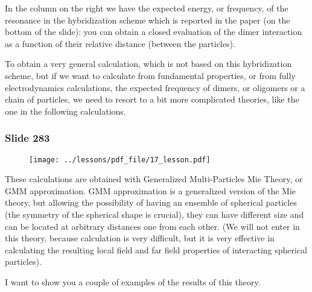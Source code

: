 \documentclass[../main/main.tex]{subfiles}
\begin{document}
In the column on the right we have the expected energy, or frequency, of the resonance in the hybridization scheme which is reported in the paper (on the bottom of the slide): you can obtain a closed evaluation of the dimer interaction as a function of their relative distance (between the particles).

To obtain a very general calculation, which is not based on this hybridization scheme, but if we want to calculate from fundamental properties, or from fully electrodynamics calculations, the expected frequency of dimers, or oligomers or a chain of particles, we need to resort to a bit more complicated theories, like the one in the following calculations.


\newpage

\subsubsection{Slide 283}

\begin{figure}[h!]
\centering
\texttt{[image: ../lessons/pdf\_file/17\_lesson.pdf]}
\end{figure}

These calculations are obtained with Generalized Multi-Particles Mie Theory, or GMM approximation. GMM approximation is a generalized version of the Mie theory, but allowing the possibility of having an ensemble of spherical particles (the symmetry of the spherical shape is crucial), they can have different size and can be located at arbitrary distances one from each other. (We will not enter in this theory, because calculation is very difficult, but it is very effective in calculating the resulting local field and far field properties of interacting spherical particles).

I want to show you a couple of examples of the results of this theory.
\end{document}

